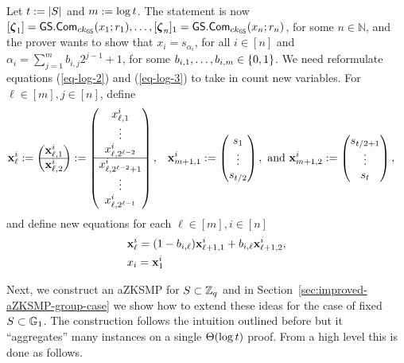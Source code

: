 Let $t:=|S|$ and \(m:=\log t \). The statement is now \([{\boldsymbol \zeta}_1]={\mathsf{GS}}.\mathsf{Com}_{ck_{\mathsf{GS}}}(x_1;r_1),\ldots,\allowbreak[{\boldsymbol \zeta}_n]_1={\mathsf{GS}}.\mathsf{Com}_{ck_{\mathsf{GS}}}(x_n;r_n)\), for some $n\in\mathbb{N}$, and the prover wants to show that \(x_i=s_{\alpha_i}\), for all \(i\in[n]\) and \(\alpha_i=\sum_{j=1}^m b_{i,j}2^{j-1}+1\), for some $b_{i,1},\ldots,b_{i,m}\in\{0,1\}$. We need reformulate equations (\ref{eq-log-2}) and (\ref{eq-log-3}) to take in count new variables. For \(\ell\in [m],j\in[n]\), define
\begin{align*}
&\mathbf{x}_\ell^i:=
\begin{pmatrix}
\mathbf{x}^i_{\ell,1}\\
\hline
\mathbf{x}^i_{\ell,2}
\end{pmatrix}
:=
\begin{pmatrix}
x^i_{\ell,1}\\\vdots\\x^i_{\ell,2^{\ell-2}}\\
\hline
x^i_{\ell,2^{\ell-2}+1}\\\vdots\\x^i_{\ell,2^{\ell-1}}
\end{pmatrix},
&\mathbf{x}^i_{m+1,1} := \begin{pmatrix}
s_1\\\vdots\\s_{t/2}
\end{pmatrix},\text{ and }
&\mathbf{x}^i_{m+1,2} := \begin{pmatrix}
s_{t/2+1}\\\vdots\\s_{t }
\end{pmatrix},
\end{align*}
and define new equations for each $\ell\in[m],i\in[n]$
\begin{align}
&\mathbf{x}^i_\ell=({1}-{b}_{i,\ell})\mathbf{x}^i_{\ell+1,1}+{b}_{i,\ell}\mathbf{x}^i_{\ell+1,2},\label{eq-alog-1}\\
&x_i= \mathbf{x}^{i}_1\label{eq-alog-2}
\end{align}

Next, we construct an aZKSMP for $S\subset\mathbb{Z}_q$ and in Section~\ref{sec:improved-aZKSMP-group-case} we show how to extend these ideas for the case of fixed \(S\subset\mathbb{G}_1\).
The construction follows the intuition outlined before but it ``aggregates'' many instances on a single \(\Theta(\log t )\) proof. From a high level this is done as follows.

